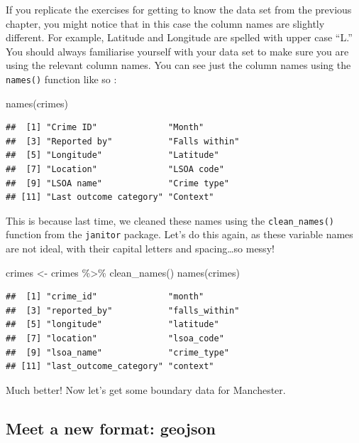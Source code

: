 \documentclass[
  krantz2]{krantz}
\makeatletter
\newenvironment{Shaded}{\begin{snugshade}}{\end{snugshade}}
\newcommand{\FunctionTok}[1]{\textcolor[rgb]{0,0,0}{#1}}
\newcommand{\NormalTok}[1]{#1}
\newcommand{\OtherTok}[1]{\textcolor[rgb]{0.37,0.37,0.37}{#1}}
\newcommand{\SpecialCharTok}[1]{\textcolor[rgb]{0,0,0}{#1}}
\newenvironment{kframe}{%
\medskip{}
\setlength{\fboxsep}{.8em}
 \def\at@end@of@kframe{}%
 \ifinner\ifhmode%
  \def\at@end@of@kframe{\end{minipage}}%
  \begin{minipage}{\columnwidth}%
 \fi\fi%
 \def\FrameCommand##1{\hskip\@totalleftmargin \hskip-\fboxsep
 \colorbox{shadecolor}{##1}\hskip-\fboxsep
     \hskip-\linewidth \hskip-\@totalleftmargin \hskip\columnwidth}%
 \MakeFramed {\advance\hsize-\width
   \@totalleftmargin\z@ \linewidth\hsize
   \@setminipage}}%
 {\par\unskip\endMakeFramed%
 \at@end@of@kframe}
\renewenvironment{Shaded}{\begin{kframe}}{\end{kframe}}
\makeatother
\begin{document}
If you replicate the exercises for getting to know the data set from the previous chapter, you might notice that in this case the column names are slightly different. For example, Latitude and Longitude are spelled with upper case ``L.'' You should always familiarise yourself with your data set to make sure you are using the relevant column names. You can see just the column names using the \texttt{names()} function like so :

\begin{Shaded}
\begin{Highlighting}[]
\FunctionTok{names}\NormalTok{(crimes)}
\end{Highlighting}
\end{Shaded}

\begin{verbatim}
##  [1] "Crime ID"              "Month"                
##  [3] "Reported by"           "Falls within"         
##  [5] "Longitude"             "Latitude"             
##  [7] "Location"              "LSOA code"            
##  [9] "LSOA name"             "Crime type"           
## [11] "Last outcome category" "Context"
\end{verbatim}

This is because last time, we cleaned these names using the \texttt{clean\_names()} function from the \texttt{janitor} package. Let's do this again, as these variable names are not ideal, with their capital letters and spacing\ldots so messy!

\begin{Shaded}
\begin{Highlighting}[]
\NormalTok{crimes }\OtherTok{\textless{}{-}}\NormalTok{ crimes }\SpecialCharTok{\%\textgreater{}\%} 
  \FunctionTok{clean\_names}\NormalTok{()}
\FunctionTok{names}\NormalTok{(crimes)}
\end{Highlighting}
\end{Shaded}

\begin{verbatim}
##  [1] "crime_id"              "month"                
##  [3] "reported_by"           "falls_within"         
##  [5] "longitude"             "latitude"             
##  [7] "location"              "lsoa_code"            
##  [9] "lsoa_name"             "crime_type"           
## [11] "last_outcome_category" "context"
\end{verbatim}

Much better! Now let's get some boundary data for Manchester.

\hypertarget{meet-a-new-format-geojson}{%
\subsection{Meet a new format: geojson}\label{meet-a-new-format-geojson}}
\end{document}
